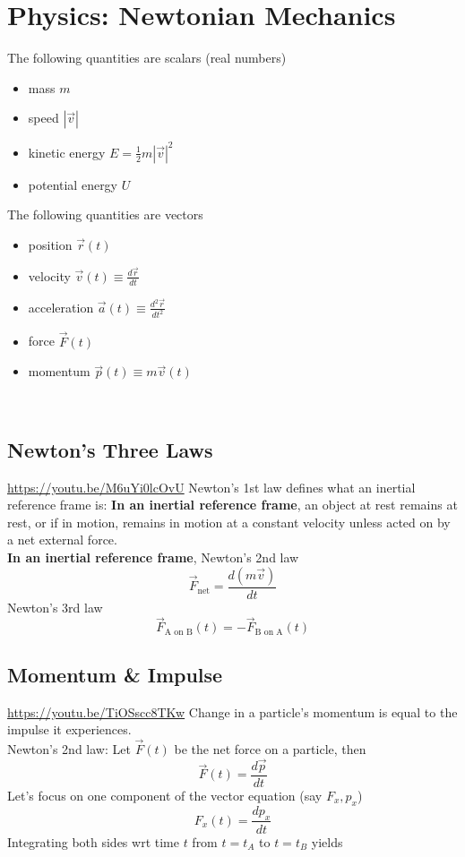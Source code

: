 \documentclass{article}
\begin{document}
\section{Physics: Newtonian Mechanics}
The following quantities are scalars (real numbers)
\begin{itemize}
    \item mass $m$
    \item speed $|\vec{v}|$
    \item kinetic energy $E = \frac{1}{2} m|\vec{v}|^2$
    \item potential energy $U$
\end{itemize}
The following quantities are vectors
\begin{itemize}
    \item position $\vec{r}(t)$
    \item velocity $\vec{v}(t) \equiv \frac{d\vec{r}}{dt}$
    \item acceleration $\vec{a}(t) \equiv \frac{d^2\vec{r}}{dt^2}$
    \item force $\vec{F}(t)$
    \item momentum $\vec{p}(t) \equiv m\vec{v}(t)$
\end{itemize}
\leavevmode \\
\subsection{Newton's Three Laws}
\url{https://youtu.be/M6uYi0lcOvU}
Newton's 1st law defines what an inertial reference frame is: \textbf{In an inertial reference frame}, an object at rest remains at rest, or if in motion, remains in motion at a constant velocity unless acted on by a net external force.\\[10pt]
\textbf{In an inertial reference frame}, Newton's 2nd law
$$\vec{F}_{\text{net}} = \frac{d(m\vec{v})}{dt}$$
Newton's 3rd law 
$$\vec{F}_{\text{A on B}}(t) = -\vec{F}_{\text{B on A}}(t)$$

\subsection{Momentum \& Impulse}
\label{sec:momimp}
\url{https://youtu.be/TiOSscc8TKw}
Change in a particle's momentum is equal to the impulse it experiences. \\[10pt]
Newton's 2nd law: Let $\vec{F}(t)$ be the net force on a particle, then
$$\vec{F}(t) = \frac{d\vec{p}}{dt}$$
Let's focus on one component of the vector equation (say $F_x, p_x$)
$$F_x(t) = \frac{dp_x}{dt}$$
Integrating both sides wrt time $t$ from $t=t_A$ to $t=t_B$ yields
\end{document}
